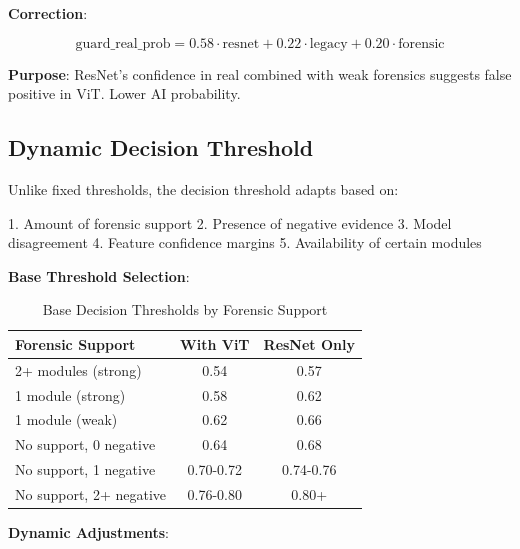 \documentclass[12pt,a4paper]{book}
\begin{document}
\textbf{Correction}:

\begin{equation}
\text{guard\_real\_prob} = 0.58 \cdot \text{resnet} + 0.22 \cdot \text{legacy} + 0.20 \cdot \text{forensic}
\end{equation}

\textbf{Purpose}: ResNet's confidence in real combined with weak forensics suggests false positive in ViT. Lower AI probability.

\subsection{Dynamic Decision Threshold}
\label{subsec:dynamic-threshold}

Unlike fixed thresholds, the decision threshold adapts based on:

1. Amount of forensic support
2. Presence of negative evidence
3. Model disagreement
4. Feature confidence margins
5. Availability of certain modules

\textbf{Base Threshold Selection}:

\begin{table}[H]
\centering
\captionsetup{justification=centering}
\caption{Base Decision Thresholds by Forensic Support}
\begin{tabular}{|l|c|c|}
\hline
\textbf{Forensic Support} & \textbf{With ViT} & \textbf{ResNet Only} \\
\hline
2+ modules (strong) & 0.54 & 0.57 \\
\hline
1 module (strong) & 0.58 & 0.62 \\
\hline
1 module (weak) & 0.62 & 0.66 \\
\hline
No support, 0 negative & 0.64 & 0.68 \\
\hline
No support, 1 negative & 0.70-0.72 & 0.74-0.76 \\
\hline
No support, 2+ negative & 0.76-0.80 & 0.80+ \\
\hline
\end{tabular}
\end{table}

\textbf{Dynamic Adjustments}:
\end{document}
